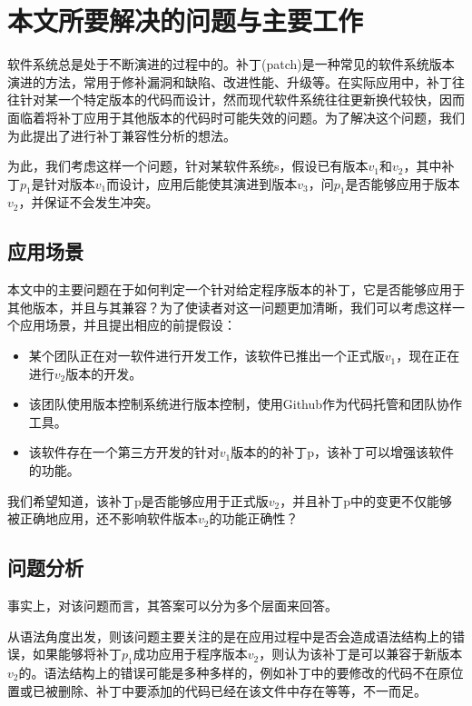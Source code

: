 \section{本文所要解决的问题与主要工作}

软件系统总是处于不断演进的过程中的。补丁(patch)是一种常见的软件系统版本演进的方法，常用于修补漏洞和缺陷、改进性能、升级等。在实际应用中，补丁往往针对某一个特定版本的代码而设计，然而现代软件系统往往更新换代较快，因而面临着将补丁应用于其他版本的代码时可能失效的问题。为了解决这个问题，我们为此提出了进行补丁兼容性分析的想法。

为此，我们考虑这样一个问题，针对某软件系统s，假设已有版本$v_1$和$v_2$，其中补丁$p_1$是针对版本$v_1$而设计，应用后能使其演进到版本$v_3$，问$p_1$是否能够应用于版本$v_{2}$，并保证不会发生冲突。

\subsection{应用场景}
\label {app}

本文中的主要问题在于如何判定一个针对给定程序版本的补丁，它是否能够应用于其他版本，并且与其兼容？为了使读者对这一问题更加清晰，我们可以考虑这样一个应用场景，并且提出相应的前提假设：

\begin{itemize}
	\item 某个团队正在对一软件进行开发工作，该软件已推出一个正式版$v_{1}$，现在正在进行$v_{2}$版本的开发。
	
	\item 该团队使用版本控制系统进行版本控制，使用Github作为代码托管和团队协作工具。
	
	\item 该软件存在一个第三方开发的针对$v_{1}$版本的的补丁p，该补丁可以增强该软件的功能。
	
\end{itemize}

我们希望知道，该补丁p是否能够应用于正式版$v_{2}$，并且补丁p中的变更不仅能够被正确地应用，还不影响软件版本$v_{2}$的功能正确性？

\subsection{问题分析}

事实上，对该问题而言，其答案可以分为多个层面来回答。

从语法角度出发，则该问题主要关注的是在应用过程中是否会造成语法结构上的错误，如果能够将补丁$p_1$成功应用于程序版本$v_2$，则认为该补丁是可以兼容于新版本$v_2$的。语法结构上的错误可能是多种多样的，例如补丁中的要修改的代码不在原位置或已被删除、补丁中要添加的代码已经在该文件中存在等等，不一而足。

